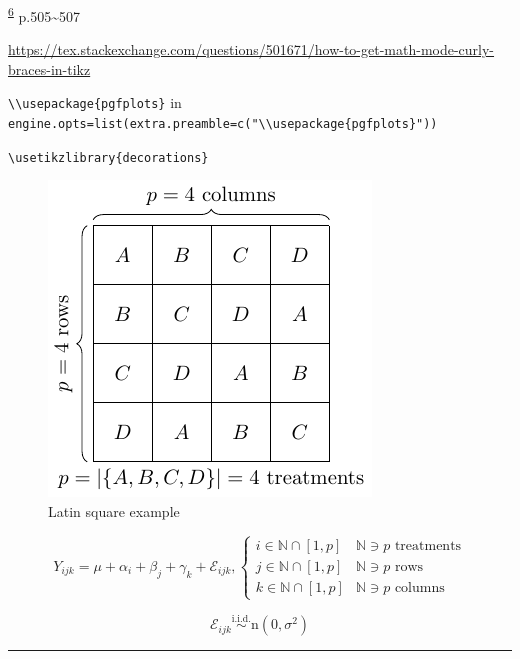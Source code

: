 \documentclass[
]{book}
\theoremstyle{definition}
\theoremstyle{definition}
\theoremstyle{definition}
\theoremstyle{definition}
\theoremstyle{remark}
\begin{document}
\textsuperscript{\protect\hyperlink{ref-zhang2021}{6}} p.505\textasciitilde507

\url{https://tex.stackexchange.com/questions/501671/how-to-get-math-mode-curly-braces-in-tikz}

\texttt{\textbackslash{}\textbackslash{}usepackage\{pgfplots\}} in \texttt{engine.opts=list(extra.preamble=c("\textbackslash{}\textbackslash{}usepackage\{pgfplots\}"))}

\texttt{\textbackslash{}usetikzlibrary\{decorations\}}

\begin{figure}
\centering
\includegraphics{202403232342-experimental-design_files/figure-latex/unnamed-chunk-2-1.pdf}
\caption{\label{fig:unnamed-chunk-2}Latin square example}
\end{figure}

\[
Y_{{\scriptscriptstyle ijk}}=\mu+\alpha_{{\scriptscriptstyle i}}+\beta_{{\scriptscriptstyle j}}+\gamma_{{\scriptscriptstyle k}}+\mathcal{E}_{{\scriptscriptstyle ijk}},\begin{cases}
i\in\mathbb{N}\cap\left[1,p\right] & \mathbb{N}\ni p\text{ treatments}\\
j\in\mathbb{N}\cap\left[1,p\right] & \mathbb{N}\ni p\text{ rows}\\
k\in\mathbb{N}\cap\left[1,p\right] & \mathbb{N}\ni p\text{ columns}
\end{cases}
\]

\[
\mathcal{E}_{{\scriptscriptstyle ijk}}\overset{\text{i.i.d.}}{\sim}\mathrm{n}\left(0,\sigma^{2}\right)
\]

\begin{center}\rule{0.5\linewidth}{0.5pt}\end{center}
\end{document}
